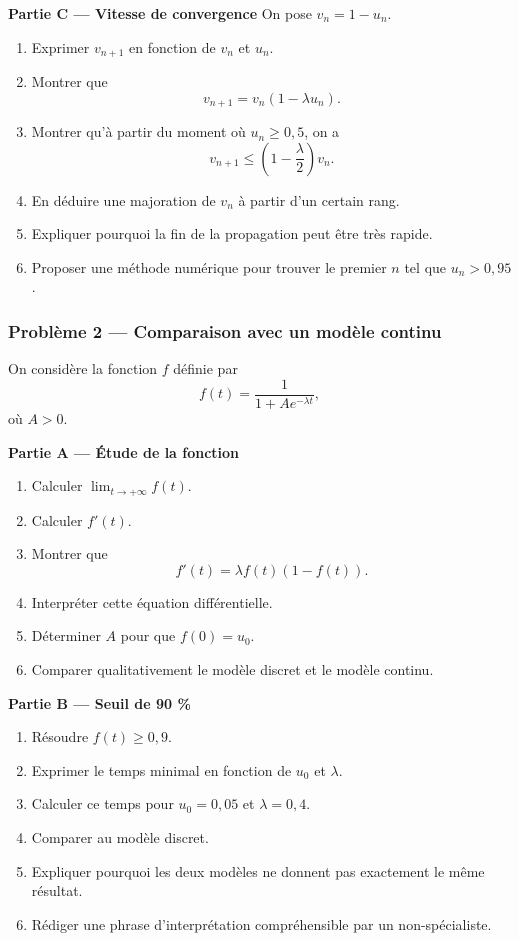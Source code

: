 \documentclass[11pt,a4paper]{article}
\begin{document}
\begin{difficile}
\textbf{Partie C — Vitesse de convergence}
On pose $v_n=1-u_n$.
\begin{enumerate}
  \item Exprimer $v_{n+1}$ en fonction de $v_n$ et $u_n$.
  \item Montrer que
  \[
  v_{n+1}=v_n(1-\lambda u_n).
  \]
  \item Montrer qu'à partir du moment où $u_n\geq 0{,}5$, on a
  \[
  v_{n+1}\leq \left(1-\frac{\lambda}{2}\right)v_n.
  \]
  \item En déduire une majoration de $v_n$ à partir d'un certain rang.
  \item Expliquer pourquoi la fin de la propagation peut être très rapide.
  \item Proposer une méthode numérique pour trouver le premier $n$ tel que $u_n>0{,}95$.
\end{enumerate}

\subsubsection*{Problème 2 — Comparaison avec un modèle continu}

On considère la fonction $f$ définie par
\[
f(t)=\frac{1}{1+Ae^{-\lambda t}},
\]
où $A>0$.

\textbf{Partie A — Étude de la fonction}
\begin{enumerate}
  \item Calculer $\lim_{t\to+\infty} f(t)$.
  \item Calculer $f'(t)$.
  \item Montrer que
  \[
  f'(t)=\lambda f(t)(1-f(t)).
  \]
  \item Interpréter cette équation différentielle.
  \item Déterminer $A$ pour que $f(0)=u_0$.
  \item Comparer qualitativement le modèle discret et le modèle continu.
\end{enumerate}

\textbf{Partie B — Seuil de 90 \%}
\begin{enumerate}
  \item Résoudre $f(t)\geq 0{,}9$.
  \item Exprimer le temps minimal en fonction de $u_0$ et $\lambda$.
  \item Calculer ce temps pour $u_0=0{,}05$ et $\lambda=0{,}4$.
  \item Comparer au modèle discret.
  \item Expliquer pourquoi les deux modèles ne donnent pas exactement le même résultat.
  \item Rédiger une phrase d'interprétation compréhensible par un non-spécialiste.
\end{enumerate}


\end{difficile}
\end{document}
